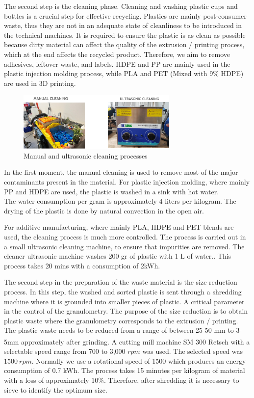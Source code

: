 \documentclass[
  11pt,
]{article}
\begin{document}
The second step is the cleaning phase. Cleaning and washing plastic cups
and bottles is a crucial step for effective recycling. Plastics are
mainly post-consumer waste, thus they are not in an adequate state of
cleanliness to be introduced in the technical machines. It is required
to ensure the plastic is as clean as possible because dirty material can
affect the quality of the extrusion / printing process, which at the end
affects the recycled product. Therefore, we aim to remove adhesives,
leftover waste, and labels. HDPE and PP are mainly used in the plastic
injection molding process, while PLA and PET (Mixed with 9\% HDPE) are
used in 3D printing.

\begin{figure}[H]

{\centering \includegraphics[width=0.7\textwidth,height=\textheight]{figures/cleaning/cleanning.jpg}

}

\caption{Manual and ultrasonic cleaning processes}

\end{figure}

In the first moment, the manual cleaning is used to remove most of the
major contaminants present in the material. For plastic injection
molding, where mainly PP and HDPE are used, the plastic is washed in a
sink with hot water.\\
The water consumption per gram is approximately 4 liters per kilogram.
The drying of the plastic is done by natural convection in the open air.

For additive manufacturing, where mainly PLA, HDPE and PET blends are
used, the cleaning process is much more controlled. The process is
carried out in a small ultrasonic cleaning machine, to ensure that
impurities are removed. The cleaner ultrasonic machine washes 200 gr of
plastic with 1 L of water.. This process takes 20 mins with a
consumption of 2kWh.

The second step in the preparation of the waste material is the size
reduction process. In this step, the washed and sorted plastic is sent
through a shredding machine where it is grounded into smaller pieces of
plastic. A critical parameter in the control of the granulometry. The
purpose of the size reduction is to obtain plastic waste where the
granulometry corresponds to the extrusion / printing. The plastic waste
needs to be reduced from a range of between 25-50 mm to 3-5mm
approximately after grinding. A cutting mill machine SM 300
Retsch\textsuperscript{\textregistered} with a selectable speed range
from 700 to 3,000 \(rpm\) was used. The selected speed was \(1500~rpm\).
Normally we use a rotational speed of 1500 which produces an energy
consumption of 0.7 kWh. The process takes 15 minutes per kilogram of
material with a loss of approximately 10\%. Therefore, after shredding
it is necessary to sieve to identify the optimum size.
\end{document}
